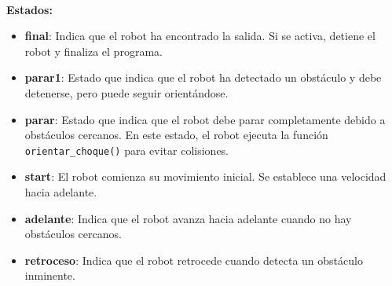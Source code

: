\documentclass[a4paper,9pt]{article}
\begin{document}
\paragraph{}
\textbf{Estados:}
\begin{itemize}
    \item \textbf{final}: Indica que el robot ha encontrado la salida. Si se activa, detiene el robot y finaliza el programa.
    \item \textbf{parar1}: Estado que indica que el robot ha detectado un obstáculo y debe detenerse, pero puede seguir orientándose.
    \item \textbf{parar}: Estado que indica que el robot debe parar completamente debido a obstáculos cercanos. En este estado, el robot ejecuta la función \texttt{orientar\_choque()} para evitar colisiones.
    \item \textbf{start}: El robot comienza su movimiento inicial. Se establece una velocidad hacia adelante.
    \item \textbf{adelante}: Indica que el robot avanza hacia adelante cuando no hay obstáculos cercanos.
    \item \textbf{retroceso}: Indica que el robot retrocede cuando detecta un obstáculo inminente.
\end{itemize}
\end{document}
